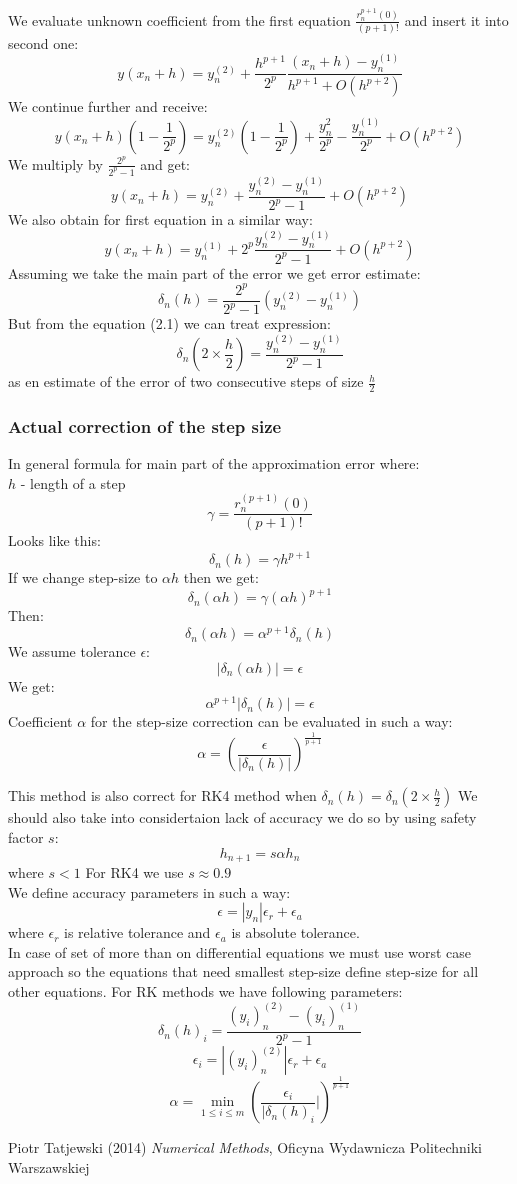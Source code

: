 \documentclass[12pt]{report}
\begin{document}
We evaluate unknown coefficient from the first equation $ \frac{r_n^{p+1}(0)}{(p+1)!} $ and insert it into second one:
\[ y(x_n+h) = y_n^{(2)} + \frac{h^{p+1}}{2^p}\frac{(x_n+h) - y_n^{(1)}}{h^{p+1} + O(h^{p+2})} \]
We continue further and receive:
\[ y(x_n + h)(1-\frac{1}{2^p}) = y_n^{(2)}(1-\frac{1}{2^p}) + \frac{y_n^{2}}{2^p} - \frac{y_n^{(1)}}{2^p} + O(h^{p+2}) \]
We multiply by $\frac{2^p}{2^p - 1}$ and get:
\begin{equation}
y(x_n+h) = y_n^{(2)} + \frac{ y_n^{(2)} - y_n^{(1)} }{ 2^p - 1 } + O(h^{p+2})
\end{equation}
We also obtain for first equation in a similar way:
 \[ y(x_n+h) = y_n^{(1)} + 2^p\frac{y_n^{(2)} - y_n^{(1)}}{2^p - 1} + O(h^{p+2}) \]
Assuming we take the main part of the error we get error estimate:
\[ \delta_n(h) = \frac{2^p}{2^p-1}(y_n^{(2)} - y_n^{(1)}) \]
But from the equation (2.1) we can treat expression:
\[ \delta_n(2 \times \frac{h}{2}) = \frac{ y_n^{(2)} - y_n^{(1)}}{2^p - 1} \]
as en estimate of the error of two consecutive steps of size $\frac{h}{2}$
\subsubsection{Actual correction of the step size}
In general formula for main part of the approximation error where:
\\ $h$ - length of a step
\[ \gamma = \frac{r_n^{(p+1)}(0)}{(p+1)!} \]
Looks like this:
\[ \delta_n(h) = \gamma h^{p+1} \]
If we change step-size to $\alpha h$ then we get:
\[ \delta_n(\alpha h) = \gamma (\alpha h)^{p+1} \]
Then:
\[ \delta_n(\alpha h) = \alpha^{p+1} \delta_n (h) \]
We assume tolerance $\epsilon$:
\[ |\delta_n(\alpha h)| = \epsilon \]
We get:
\[ \alpha^{p+1}|\delta_n(h)| = \epsilon \]
Coefficient $\alpha$ for the step-size correction can be evaluated in such a way:
\[ \alpha = (\frac{\epsilon}{|\delta_n (h)|})^{\frac{1}{p+1}} \]

This method is also correct for RK4 method when $\delta_n(h) = \delta_n(2 \times \frac{h}{2}) $
We should also take into considertaion lack of accuracy we do so by using safety factor $s$:
\[ h_{n+1} = s \alpha h_n \]
where $ s < 1 $
For RK4 we use $ s \approx 0.9 $ \\
We define accuracy parameters in such a way:
\[ \epsilon = |y_n| \epsilon_r + \epsilon_a \]
where $\epsilon_r$ is relative tolerance and $\epsilon_a$ is absolute tolerance. \\
In case of set of more than on differential equations we must use worst case approach so the equations that need smallest step-size define step-size for all other equations.
\newpage
For RK methods we have following parameters:
\[ \delta_n(h)_i = \frac{(y_i)_n^{(2)} - (y_i)_n^{(1)}}{2^p - 1} \]
\[ \epsilon_i = |(y_i)_n^{(2)}| \epsilon_r + \epsilon_a \]
\[ \alpha = \min_{1 \leq i \leq m} (\frac{\epsilon_i}{|\delta_n(h)_i}|)^{\frac{1}{p+1}} \]


\begin{thebibliography}{9}
Piotr Tatjewski (2014) \emph{Numerical Methods}, Oficyna Wydawnicza Politechniki Warszawskiej
\end{thebibliography}
\end{document}
